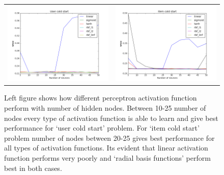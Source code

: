 \documentclass[paper=a4, fontsize=11pt]{scrartcl} %
\numberwithin{equation}{section} %
\numberwithin{figure}{section} %
\numberwithin{table}{section} %
\begin{document}
\renewcommand{\tabcolsep}{0.01cm}
\begin{figure}
\begin{tabular}{cc}
\includegraphics[width=0.5\linewidth]{users} &
\includegraphics[width=0.5\linewidth]{items} \\
\end{tabular}
\caption{Left figure shows how different perceptron activation function perform with number of hidden nodes. Between 10-25 number of nodes every type of activation function is able to learn and give best performance for `user cold start' problem. For `item cold start' problem number of nodes between 20-25 gives best performance for all types of activation functions. Its evident that linear activation function performs very poorly and `radial basis functions' perform best in both cases.}
\label{fig:neuron_vs_nmae}
\end{figure}
\end{document}
